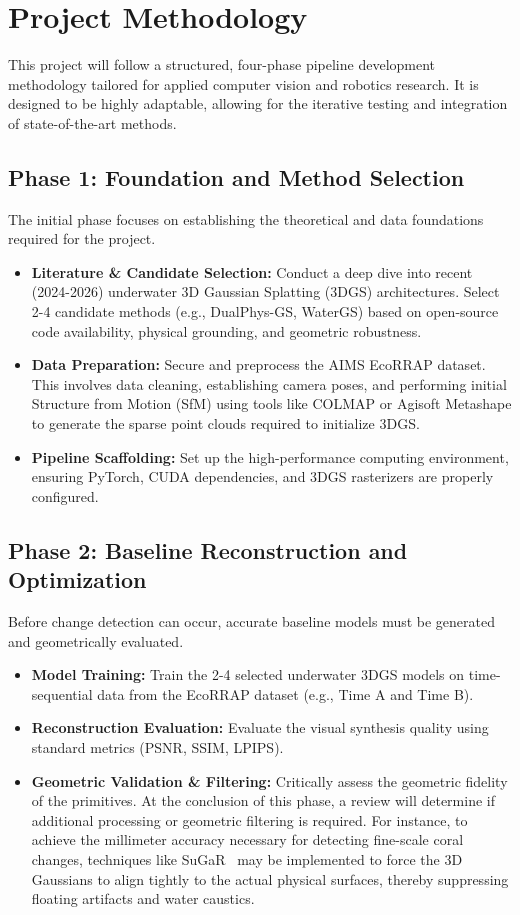 \chapter{Project Methodology}

This project will follow a structured, four-phase pipeline development methodology tailored for applied computer vision and robotics research. It is designed to be highly adaptable, allowing for the iterative testing and integration of state-of-the-art methods.

\section{Phase 1: Foundation and Method Selection}
The initial phase focuses on establishing the theoretical and data foundations required for the project.
\begin{itemize}
    \item \textbf{Literature \& Candidate Selection:} Conduct a deep dive into recent (2024-2026) underwater 3D Gaussian Splatting (3DGS) architectures. Select 2-4 candidate methods (e.g., DualPhys-GS, WaterGS) based on open-source code availability, physical grounding, and geometric robustness.
    \item \textbf{Data Preparation:} Secure and preprocess the AIMS EcoRRAP dataset. This involves data cleaning, establishing camera poses, and performing initial Structure from Motion (SfM) using tools like COLMAP or Agisoft Metashape to generate the sparse point clouds required to initialize 3DGS.
    \item \textbf{Pipeline Scaffolding:} Set up the high-performance computing environment, ensuring PyTorch, CUDA dependencies, and 3DGS rasterizers are properly configured.
\end{itemize}

\section{Phase 2: Baseline Reconstruction and Optimization}
Before change detection can occur, accurate baseline models must be generated and geometrically evaluated.
\begin{itemize}
    \item \textbf{Model Training:} Train the 2-4 selected underwater 3DGS models on time-sequential data from the EcoRRAP dataset (e.g., Time A and Time B).
    \item \textbf{Reconstruction Evaluation:} Evaluate the visual synthesis quality using standard metrics (PSNR, SSIM, LPIPS).
    \item \textbf{Geometric Validation \& Filtering:} Critically assess the geometric fidelity of the primitives. At the conclusion of this phase, a review will determine if additional processing or geometric filtering is required. For instance, to achieve the millimeter accuracy necessary for detecting fine-scale coral changes, techniques like SuGaR~\cite{guedon2024sugar} may be implemented to force the 3D Gaussians to align tightly to the actual physical surfaces, thereby suppressing floating artifacts and water caustics.
\end{itemize}

